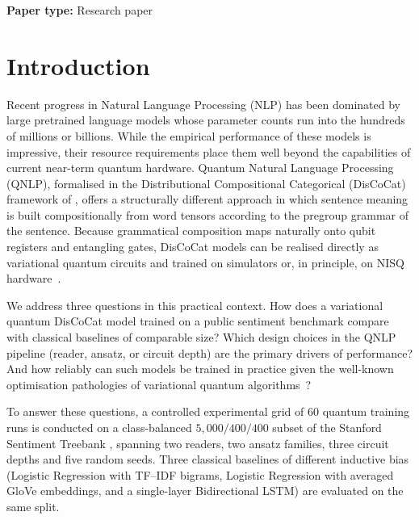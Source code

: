 \documentclass[11pt, a4paper]{article}
\begin{document}
\vspace{0.4em}

\noindent\textbf{Paper type:} Research paper

\vspace{1.5em}

\section{Introduction}
\label{sec:intro}

Recent progress in Natural Language Processing (NLP) has been dominated
by large pretrained language models whose parameter counts run into the
hundreds of millions or billions. While the empirical performance of
these models is impressive, their resource requirements place them
well beyond the capabilities of current near-term quantum hardware.
Quantum Natural Language Processing (QNLP), formalised in the
Distributional Compositional Categorical (DisCoCat) framework of
\citet{coecke2010}, offers a structurally different approach in which
sentence meaning is built compositionally from word tensors according
to the pregroup grammar of the sentence. Because grammatical
composition maps naturally onto qubit registers and entangling gates,
DisCoCat models can be realised directly as variational quantum
circuits and trained on simulators or, in principle, on NISQ
hardware~\citep{lorenz2021, kartsaklis2021}.

We address three questions in this practical context.
How does a variational quantum DisCoCat model trained on a public
sentiment benchmark compare with classical baselines of comparable
size? Which design choices in the QNLP pipeline (reader, ansatz, or
circuit depth) are the primary drivers of performance? And how
reliably can such models be trained in practice given the well-known
optimisation pathologies of variational quantum
algorithms~\citep{mcclean2018}?

To answer these questions, a controlled experimental grid of 60
quantum training runs is conducted on a class-balanced
\(5{,}000/400/400\) subset of the Stanford Sentiment Treebank
\citep{socher2013}, spanning two readers, two ansatz families, three
circuit depths and five random seeds. Three classical baselines of
different inductive bias (Logistic Regression with TF--IDF bigrams,
Logistic Regression with averaged GloVe embeddings, and a
single-layer Bidirectional LSTM) are evaluated on the same split.
\end{document}
